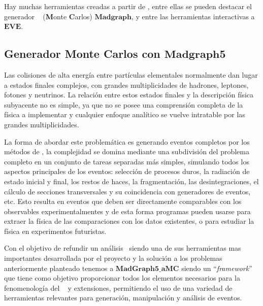Hay muchas herramientas creadas a partir de \ROOT, entre ellas se pueden destacar el generador \MC ~ (\textbf{M}onte \textbf{C}arlos) $\mathbf{Madgraph}$, y entre las herramientas interactivas a $\mathbf{EVE}$.



\subsection{Generador Monte Carlos con $\mathbf{Madgraph5}$}\label{C_madgraph}

Las colisiones de alta energía entre partículas elementales normalmente dan lugar a estados finales complejos, con grandes multiplicidades de hadrones, leptones, fotones y neutrinos. La relación entre estos estados finales y la descripción física subyacente no es simple, ya que no se posee una comprensión completa de la física a implementar y cualquier enfoque analítico se vuelve intratable por las grandes multiplicidades.

La forma de abordar este problemática es generando eventos completos por los métodos de \MC, la complejidad se domina mediante una subdivisión del problema completo en un conjunto de tareas separadas más simples, simulando todos los aspectos principales de los eventos: selección de procesos duros, la radiación de estado inicial y final, los restos de haces, la fragmentación, las desintegraciones, el cálculo de secciones transversales y su coincidencia con generadores de eventos, etc. Esto resulta en eventos que deben ser directamente comparables con los observables experimentalmentes y de esta forma programas pueden usarse para extraer la física de las comparaciones con los datos existentes, o para estudiar la física en experimentos futuristas.

Con el objetivo de refundir un análisis \LHC ~siendo una de sus herramientas mas importantes desarrollada por el proyecto y la solución a los problemas anteriormente planteado tenemos a $\mathbf{MadGraph5\_aMC}$ \citep{alwall_automated_2014} siendo un ``\textit{framework}'' que tiene como objetivo proporcionar todos los elementos necesarios para la fenomenología del \ME ~ y extensiones, permitiendo el uso de una variedad de herramientas relevantes para generación, manipulación y análisis de eventos. 

